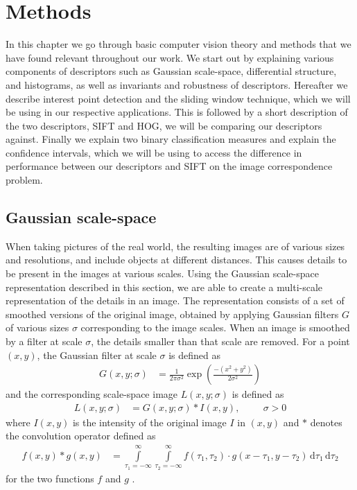 \documentclass[thesis.tex]{subfiles}
\begin{document}
%
\chapter{Methods}
%
In this chapter we go through basic computer vision theory and methods that we have found relevant throughout our work. We start out by explaining various components of descriptors such as Gaussian scale-space, differential structure, and histograms, as well as invariants and robustness of descriptors. Hereafter we describe interest point detection and the sliding window technique, which we will be using in our respective applications. This is followed by a short description of the two descriptors, SIFT and HOG, we will be comparing our descriptors against. Finally we explain two binary classification measures and explain the confidence intervals, which we will be using to access the difference in performance between our descriptors and SIFT on the image correspondence problem.
%
\section{Gaussian scale-space}
\label{sec:GaussianScaleSpace}
%
When taking pictures of the real world, the resulting images are of various sizes and resolutions, and include objects at different distances. This causes details to be present in the images at various scales. Using the Gaussian scale-space representation \cite{griffin1997scale,ginneken2000applications} described in this section, we are able to create a multi-scale representation of the details in an image. The representation consists of a set of smoothed versions of the original image, obtained by applying Gaussian filters $G$ of various sizes $\sigma$ corresponding to the image scales. When an image is smoothed by a filter at scale $\sigma$, the details smaller than that scale are removed. For a point $(x,y)$, the Gaussian filter at scale $\sigma$ is defined as
%
\begin{align}
	G(x,y;\sigma) &= \frac{1}{2\pi \sigma^2} \exp \left(\frac{-(x^2+y^2)}{2\sigma^2} \right)
\end{align}
%
and the corresponding scale-space image $L(x,y;\sigma)$ is defined as
%
\begin{align}
	L(x,y;\sigma) &= G(x,y;\sigma) \ast I(x,y),\hspace{1cm}\sigma > 0
\end{align}
%
where $I(x,y)$ is the intensity of the original image $I$ in $(x,y)$ and $\ast$ denotes the convolution operator defined as
\begin{align*}
	f(x,y) \ast g(x,y) &= \int\limits_{\tau_1 = -\infty}^\infty \int\limits_{\tau_2 = -\infty}^\infty f(\tau_1,\tau_2) \cdot g(x-\tau_1,y-\tau_2)\,\text{d}\tau_1\,\text{d}\tau_2
\end{align*}
for the two functions $f$ and $g$ \cite[p.~345]{gonzalez:2008:digital}.
\end{document}
